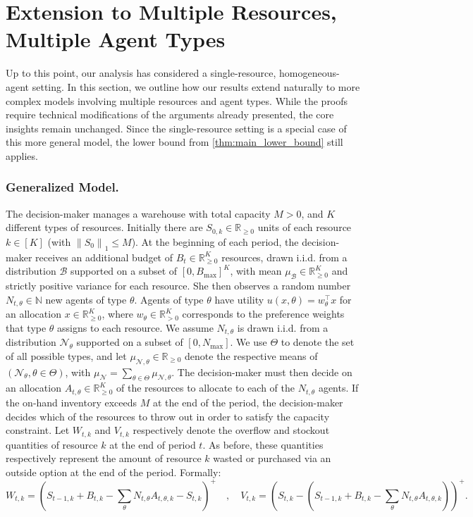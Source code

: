 \documentclass[mnsc,nonblindrev]{informs3}
\newcommand{\norm}[1]{\left \lVert #1 \right \rVert}
\newcommand{\NDist}{\mathcal{N}}
\newcommand{\BDist}{\mathcal{B}}
\newcommand{\Nmean}{\mu_{\NDist}}
\renewcommand{\paragraph}[1]{\subsubsection*{#1}}
\begin{document}
\section{Extension to Multiple Resources, Multiple Agent Types}
\label{sec:extensions}

Up to this point, our analysis has considered a single-resource, homogeneous-agent setting. In this section, we outline how our results extend naturally to more complex models involving multiple resources and agent types. While the proofs require technical modifications of the arguments already presented, the core insights remain unchanged.  Since the single-resource setting is a special case of this more general model, the lower bound from \cref{thm:main_lower_bound} still applies.

\paragraph{Generalized Model.} The decision-maker manages a warehouse with total capacity $M > 0$, and $K$ different types of resources. Initially there are $S_{0,k} \in \mathbb{R}_{\geq 0}$ units of each resource $k \in [K]$ (with $\norm{S_0}_1 \leq M$).  At the beginning of each period, the decision-maker receives an additional budget of $B_t \in \mathbb{R}^K_{\geq 0}$ resources, drawn i.i.d. from a distribution $\BDist$ supported on a subset of $[0,B_{\max}]^K$, with mean $\mu_{\BDist} \in \mathbb{R}^K_{\geq 0}$ and strictly positive variance for each resource.  She then observes a random number $N_{t,\theta} \in \mathbb{N}$ new agents of type $\theta$.  Agents of type $\theta$ have utility 
$u(x, \theta) = w_{\theta}^\top x$ for an allocation $x \in \mathbb{R}^K_{\geq 0}$, where $w_{\theta} \in \mathbb{R}^K_{>0}$ corresponds to the preference weights that type $\theta$ assigns to each resource. 
We assume $N_{t,\theta}$ is drawn i.i.d. from a distribution $\mathcal{N}_{\theta}$ supported on a subset of $[0,N_{\max}]$. We use $\Theta$ to denote the set of all possible types, and let $\mu_{\NDist, \theta} \in \mathbb{R}_{\geq 0}$ denote the respective means of $(\mathcal{N}_{\theta}, \theta \in \Theta)$, with  $\Nmean = \sum_{\theta \in \Theta} \mu_{\mathcal{N}, \theta}$. The decision-maker must then decide on an allocation $A_{t, \theta} \in \mathbb{R}^{K}_{\geq 0}$ of the resources to allocate to each of the $N_{t,\theta}$ agents.  If the on-hand inventory exceeds $M$ at the end of the period, the decision-maker decides which of the resources to throw out in order to satisfy the capacity constraint. Let $W_{t,k}$ and $V_{t,k}$ respectively denote the overflow and stockout quantities of resource $k$ at the end of period $t$. As before, these quantities respectively represent the amount of resource $k$ wasted or purchased via an outside option at the end of the period. Formally:
\begin{equation*}
W_{t,k} = (S_{t-1,k} + B_{t,k} - \sum_{\theta} N_{t, \theta} A_{t,\theta,k}  - S_{t,k})^+ \quad,\quad V_{t,k} = (S_{t,k} - (S_{t-1,k} + B_{t,k} - \sum_{\theta} N_{t, \theta} A_{t,\theta,k} ))^+.
\end{equation*}
\end{document}
